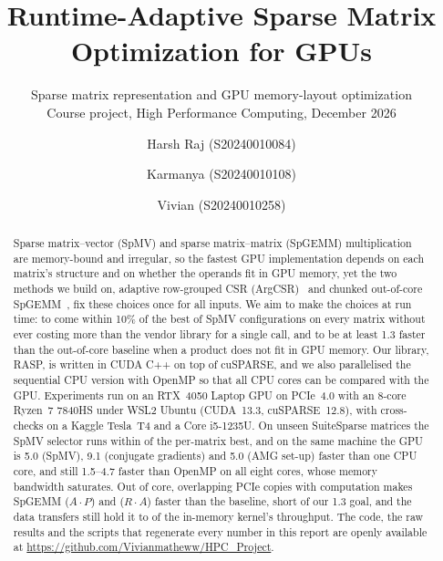 \documentclass[sigconf,nonacm]{acmart}
\begin{document}
\title{Runtime-Adaptive Sparse Matrix Optimization for GPUs}
\subtitle{Sparse matrix representation and GPU memory-layout optimization\\[2pt]
  Course project, High Performance Computing, December 2026}

\author{Harsh Raj (S20240010084)}
\author{Karmanya (S20240010108)}
\author{Vivian (S20240010258)}
\renewcommand{\shortauthors}{Harsh Raj, Karmanya and Vivian}

\begin{abstract}
Sparse matrix--vector (SpMV) and sparse matrix--matrix (SpGEMM) multiplication are memory-bound and irregular, so the
fastest GPU implementation depends on each matrix's structure and on whether the operands fit in GPU memory, yet the
two methods we build on, adaptive row-grouped CSR (ArgCSR)~\cite{heller2012argcsr} and chunked out-of-core
SpGEMM~\cite{deveci2018multilevel}, fix these choices once for all inputs.
We aim to make the choices at run time: to come within 10\% of the best of  SpMV configurations on
every matrix without ever costing more than the vendor library for a single call, and to be at least 1.3\x{} faster
than the out-of-core baseline when a product does not fit in GPU memory.
Our library, RASP, is written in CUDA C++ on top of cuSPARSE, and we also parallelised the sequential CPU version
with OpenMP so that all CPU cores can be compared with the GPU.
Experiments run on an RTX~4050 Laptop GPU on PCIe~4.0 with an 8-core Ryzen~7 7840HS under WSL2 Ubuntu (CUDA~13.3,
cuSPARSE~12.8), with cross-checks on a Kaggle Tesla~T4 and a Core i5-1235U.
On  unseen SuiteSparse matrices the SpMV selector runs within \x{} of the
per-matrix best, and on the same machine the GPU is 5.0\x{} (SpMV), 9.1\x{} (conjugate gradients) and 5.0\x{} (AMG
set-up) faster than one CPU core, and still 1.5--4.7\x{} faster than OpenMP on all eight cores, whose memory bandwidth
saturates.
Out of core, overlapping PCIe copies with computation makes SpGEMM \x{} ($A\cdot P$) and
\x{} ($R\cdot A$) faster than the baseline, short of our 1.3\x{} goal, and the data transfers still hold
it to  of the in-memory kernel's throughput.
The code, the raw results and the scripts that regenerate every number in this report are openly available at
\url{https://github.com/Vivianmatheww/HPC_Project}.
\end{abstract}
\end{document}
